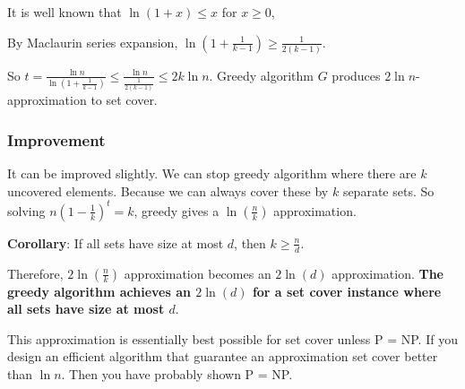 It is well known that $\ln (1 + x) \le x$ for $x \ge 0$,

By Maclaurin series expansion, $\ln ( 1 + \frac{1}{k-1}) \ge \frac{1}{2(k-1)}$.

So $t = \frac{\ln n}{\ln (1 + \frac{1}{k-1})} \le \frac{\ln n}{\frac{1}{2(k-1)}} \le 2 k \ln n$. Greedy algorithm $G$ produces $2\ln n$-approximation to set cover.

\subsubsection{Improvement} 
It can be improved slightly. We can stop greedy algorithm where there are $k$ uncovered elements. Because we can always cover these by $k$ separate sets. So solving $n ( 1 - \frac{1}{k})^t = k$, greedy gives a $\ln(\frac{n}{k})$ approximation.

\textbf{Corollary}: If all sets have size at most $d$, then $k \ge \frac{n}{d}$. 

 Therefore, $2\ln(\frac{n}{k})$ approximation becomes an $2\ln(d)$ approximation. \textbf{The greedy algorithm achieves an $2\ln(d)$ for a set cover instance where all sets have size at most $d$}.

This approximation is essentially best possible for set cover unless P = NP. If you design an efficient algorithm that guarantee an approximation set cover better than $\ln n$. Then you have probably shown P = NP.































